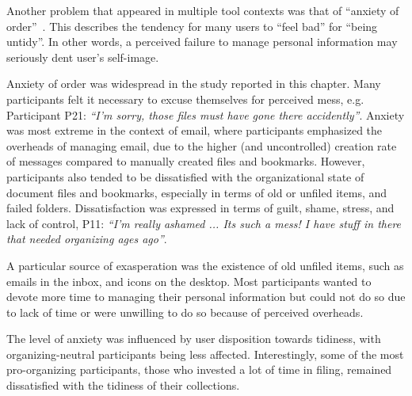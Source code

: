 Another problem that appeared in multiple tool contexts was that of ``anxiety of order''~\citep{levy:01}.  This describes the tendency for many users to ``feel bad'' for ``being untidy''.  In other words, a perceived failure to manage personal information may seriously dent user's self-image.

Anxiety of order was widespread in the study reported in this chapter.  Many participants felt it necessary to excuse themselves for perceived mess, e.g. Participant P21: \textit{``I'm sorry, those files must have gone there accidently''}.  Anxiety was most extreme in the context of email, where participants emphasized the overheads of managing email, due to the higher (and uncontrolled) creation rate of messages compared to manually created files and bookmarks. %
However, participants also tended to be dissatisfied with the organizational state of document files and bookmarks, especially in terms of old or unfiled items, and failed folders. Dissatisfaction was expressed in terms of guilt, shame, stress, and lack of control, P11: \textit{``I'm really ashamed ... Its such a mess! I have stuff in there that needed organizing ages ago''}.

A particular source of exasperation was the existence of old unfiled items, such as emails in the inbox, and icons on the desktop. Most participants wanted to devote more time to managing their personal information but could not do so due to lack of time or were unwilling to do so because of perceived overheads.

The level of anxiety was influenced by user disposition towards tidiness, with organizing-neutral participants being less affected.  Interestingly, some of the most pro-organizing participants, those who invested a lot of time in filing, remained dissatisfied with the tidiness of their collections. 

